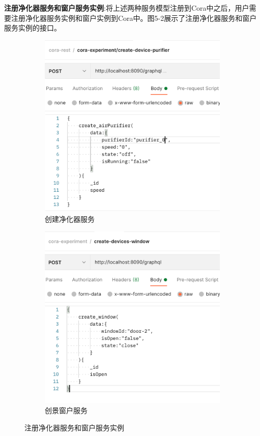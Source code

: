 \documentclass[winfonts,master,twoside]{njuthesis}
\begin{document}
\textbf{注册净化器服务和窗户服务实例}:将上述两种服务模型注册到Cora中之后，用户需要注册净化器服务实例和窗户实例到Cora中。图5-2展示了注册净化器服务和窗户服务实例的接口。
\begin{figure}[H]
	\begin{subfigure}{.5\textwidth}
		\centering
		\includegraphics[width=1.1\textwidth]{figure/5-experiment/purifier-api.png}
		\caption{创建净化器服务}
		\label{subfig:a}
	\end{subfigure}
	\begin{subfigure}{.5\textwidth}
		\centering
		\includegraphics[width=1.1\textwidth]{figure/5-experiment/window-api.png}
		\caption{创景窗户服务}
		\label{subfig:b}
	\end{subfigure}
\caption{注册净化器服务和窗户服务实例}
\label{fig:sub}
\end{figure}
\end{document}
